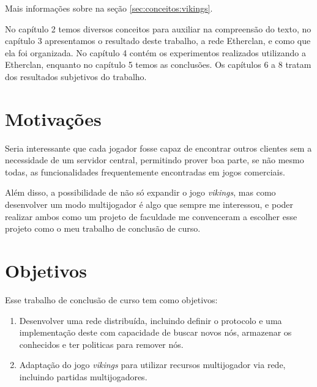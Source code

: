  Mais informações sobre na seção \ref{sec:conceitos:vikings}.

No capítulo 2 temos diversos conceitos para auxiliar na compreensão do texto,
no capítulo 3 apresentamos o resultado deste trabalho, a rede Etherclan, e como
que ela foi organizada. No capítulo 4 contém os experimentos realizados utilizando
a Etherclan, enquanto no capítulo 5 temos as conclusões. Os capítulos 6 a 8 tratam
dos resultados subjetivos do trabalho.

\section{Motivações}
\label{sec:intr:motivacoes}

Seria interessante que cada jogador fosse capaz de encontrar outros clientes
sem a necessidade de um servidor central, permitindo prover boa parte, se não
mesmo todas, as funcionalidades frequentemente encontradas em jogos comerciais.

Além disso, a possibilidade de não só expandir o jogo \textit{vikings}, mas como
desenvolver um modo multijogador é algo que sempre me interessou, e poder
realizar ambos como um projeto de faculdade me convenceram a escolher esse
projeto como o meu trabalho de conclusão de curso.

\section{Objetivos}
\label{sec:intr:objetivos}

Esse trabalho de conclusão de curso tem como objetivos:

\begin{enumerate}
  \item Desenvolver uma rede distribuída, incluindo definir o protocolo e uma implementação deste com capacidade de 
    buscar novos nós, armazenar os conhecidos e ter politicas para remover nós.
    
  \item Adaptação do jogo \textit{vikings} para utilizar recursos multijogador via rede, incluindo partidas
    multijogadores.
\end{enumerate}






